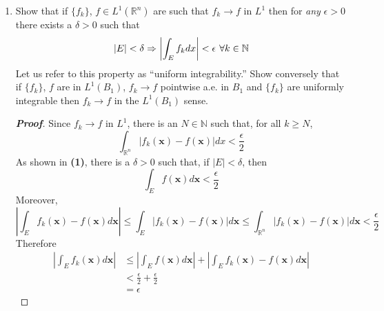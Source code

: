 \documentclass[12pt,leqno]{book}
\theoremstyle{definition}
\newcommand{\N}{\mathbb{N}}
\newcommand{\R}{\mathbb{R}}
\newenvironment{Proof}{\begin{proof}[\textnormal{\textbf{Proof}}]}{\end{proof}}
\begin{document}
\begin{enumerate}
\begin{Proof}
We now wish to show that $\displaystyle\lim_{\|\mathbf{x}\|\to0}F_r(\mathbf{x})=0$. To see this, notice that, for every $\epsilon>0$ there is a $\delta>0$ such that \[\left|\int_{\R^n-B_{\delta}(\mathbf{0})}f(\mathbf{y})d\mathbf{y}\right|=\left|\int_{\R^n}f(\mathbf{y})d\mathbf{y}-\int_{B_{\delta}(\mathbf{0})}f(\mathbf{y})d\mathbf{y}\right|<|B_r(\mathbf{x})|\epsilon\] Then, for $\mathbf{x}$ such that $\|\mathbf{x}\|$ is sufficiently large, $B_r(\mathbf{x})\subseteq\R^n-B_{\delta}(\mathbf{0})$. Thus \begin{align*}\left|F_r(\mathbf{x})\right|&=\frac{1}{|B_r(\mathbf{x})|}\left|\int_{B_r(\mathbf{x})}f(\mathbf{y})d\mathbf{y}\right|\\&\leq\frac{1}{|B_r(\mathbf{x})|}\left|\int_{\R^n-B_{\delta}(\mathbf{0})}f(\mathbf{y})d\mathbf{y}\right|\\&<\epsilon\end{align*} so \[F_r(\mathbf{x})\to0\] as \[\|x\|\to\infty\] 

Now note that, if $f$ is continuous, then $F_r(\mathbf{x})=\int_{B_r(\mathbf{x})}f(\mathbf{y})d\mathbf{y}$ is just the Riemann integral of $f$ on $B_r(\mathbf{x})$. However, by the Mean Value Theorem for Integrals, there is a $\mathbf{c}\in B_r(\mathbf{x})$ such that $F_r(\mathbf{x})=f(\mathbf{c})$. Thus, \begin{align*}\lim_{r\to0}F_r(\mathbf{x})&=\lim_{r\to0}f(\mathbf{c})\\&=f\left(\lim_{r\to0}\mathbf{c}\right)\\&=f(\mathbf{x})\qedhere\end{align*}
\end{Proof}
\item Show that if $\{f_k\}$, $f\in L^1(\R^n)$ are such that $f_k\to f$ in $L^1$ then for \textit{any} $\epsilon>0$ there exists a $\delta>0$ such that \[|E|<\delta\Rightarrow\left|\int_Ef_kdx\right|<\epsilon\hskip.05in\forall k\in\N\] Let us refer to this property as ``uniform integrability.'' Show conversely that if $\{f_k\}$, $f$ are in $L^1(B_1)$, $f_k\to f$ pointwise a.e. in $B_1$ and $\{f_k\}$ are uniformly integrable then $f_k\to f$ in the $L^1(B_1)$ sense.
\begin{Proof}
 Since $f_k\to f$ in $L^1$, there is an $N\in\N$ such that, for all $k\geq N$, \[\int_{\R^n}|f_k(\mathbf{x})-f(\mathbf{x})|dx<\frac{\epsilon}{2}\] As shown in \textbf{(1)}, there is a $\delta>0$ such that, if $|E|<\delta$, then \[\int_Ef(\mathbf{x})d\mathbf{x}<\frac{\epsilon}{2}\] Moreover, \[\left|\int_Ef_k(\mathbf{x})-f(\mathbf{x})d\mathbf{x}\right|\leq\int_E|f_k(\mathbf{x})-f(\mathbf{x})|d\mathbf{x}\leq\int_{\R^n}|f_k(\mathbf{x})-f(\mathbf{x})|d\mathbf{x}<\frac{\epsilon}{2}\] Therefore \begin{align*}\left|\int_Ef_k(\mathbf{x})d\mathbf{x}\right|&\leq\left|\int_Ef(\mathbf{x})d\mathbf{x}\right|+\left|\int_Ef_k(\mathbf{x})-f(\mathbf{x})d\mathbf{x}\right|\\&<\frac{\epsilon}{2}+\frac{\epsilon}{2}\\&=\epsilon\end{align*}
\end{Proof}


\end{enumerate}
\end{document}
